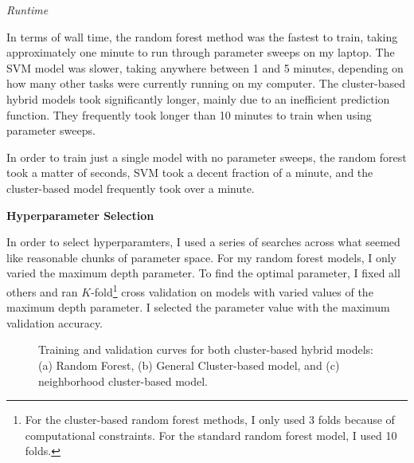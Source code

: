 \documentclass{ws-ijprai}
\newcommand{\subheader}[1]{\bigskip\begin{center}\textbf{#1}\end{center}}
\newcommand{\subsubheader}[1]{\smallskip\begin{center}\textit{#1}\end{center}}
\begin{document}
\subsubheader{Runtime}

In terms of wall time, the random forest method was the fastest to train, taking approximately one minute to run through parameter sweeps on my laptop. The SVM model was slower, taking anywhere between 1 and 5 minutes, depending on how many other tasks were currently running on my computer. The cluster-based hybrid models took significantly longer, mainly due to an inefficient prediction function. They frequently took longer than 10 minutes to train when using parameter sweeps.

In order to train just a single model with no parameter sweeps, the random forest took a matter of seconds, SVM took a decent fraction of a minute, and the cluster-based model frequently took over a minute.


\subheader{Hyperparameter Selection}

In order to select hyperparamters, I used a series of searches across what seemed like reasonable chunks of parameter space. For my random forest models, I only varied the maximum depth parameter. To find the optimal parameter, I fixed all others and ran $K$-fold\footnote{For the cluster-based random forest methods, I only used 3 folds because of computational constraints. For the standard random forest model, I used 10 folds.} cross validation on models with varied values of the maximum depth parameter. I selected the parameter value with the maximum validation accuracy.

\begin{figure}[H]
  \centering
  \caption{Training and validation curves for both cluster-based hybrid models: (a) Random Forest, (b) General Cluster-based model, and (c) neighborhood cluster-based model.}
  \label{fig:training-clusters}
\end{figure}
\end{document}
